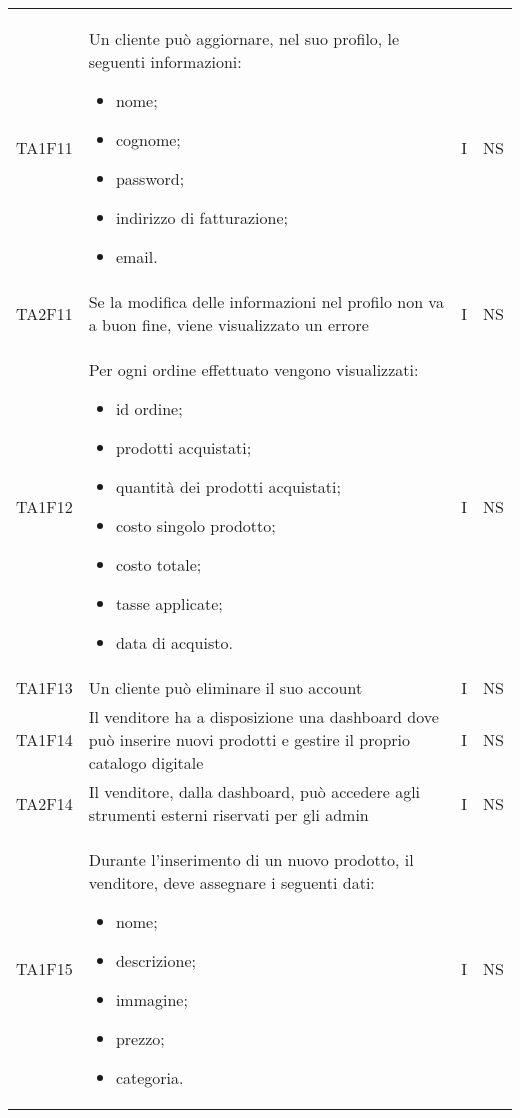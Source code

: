 {\begin{longtable}{C{2cm} C{9.6cm} C{1.5cm} C{1cm}}
TA1F11 & Un cliente può aggiornare, nel suo profilo, le seguenti informazioni:
\begin{itemize}
	\item nome;
	\item cognome;
	\item password;
	\item indirizzo di fatturazione;
	\item email.
\end{itemize}
& I & NS\\

TA2F11 & Se la modifica delle informazioni nel profilo non va a buon fine, viene visualizzato un errore & I & NS\\

TA1F12 & Per ogni ordine effettuato vengono visualizzati:
\begin{itemize}
	\item id ordine;
	\item prodotti acquistati;
	\item quantità dei prodotti acquistati;
	\item costo singolo prodotto;
	\item costo totale;
	\item tasse applicate;
	\item data di acquisto.
\end{itemize}
& I & NS\\

TA1F13 & Un cliente può eliminare il suo account & I & NS\\

TA1F14 & Il venditore ha a disposizione una dashboard dove può inserire nuovi prodotti e gestire il proprio catalogo digitale & I & NS\\

TA2F14 & Il venditore, dalla dashboard, può accedere agli strumenti esterni riservati per gli admin & I & NS\\

TA1F15 & Durante l'inserimento di un nuovo prodotto, il venditore, deve assegnare i seguenti dati:
\begin{itemize}
	\item nome;
	\item descrizione;
	\item immagine;
	\item prezzo;
	\item categoria.
\end{itemize} & I & NS\\


\end{longtable}}
